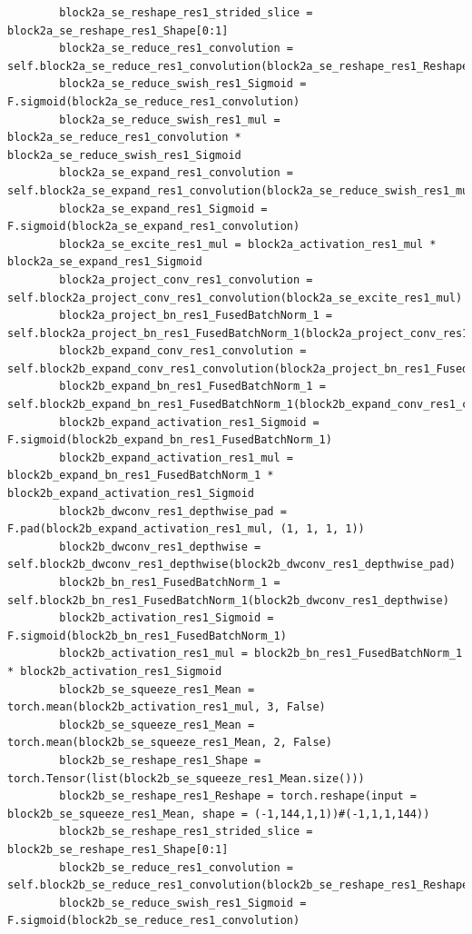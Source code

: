 \documentclass{fisatprojectfinal}
\begin{document}
\begin{appendices}
\begin{lstlisting}
        block2a_se_reshape_res1_strided_slice = block2a_se_reshape_res1_Shape[0:1]
        block2a_se_reduce_res1_convolution = self.block2a_se_reduce_res1_convolution(block2a_se_reshape_res1_Reshape)
        block2a_se_reduce_swish_res1_Sigmoid = F.sigmoid(block2a_se_reduce_res1_convolution)
        block2a_se_reduce_swish_res1_mul = block2a_se_reduce_res1_convolution * block2a_se_reduce_swish_res1_Sigmoid
        block2a_se_expand_res1_convolution = self.block2a_se_expand_res1_convolution(block2a_se_reduce_swish_res1_mul)
        block2a_se_expand_res1_Sigmoid = F.sigmoid(block2a_se_expand_res1_convolution)
        block2a_se_excite_res1_mul = block2a_activation_res1_mul * block2a_se_expand_res1_Sigmoid
        block2a_project_conv_res1_convolution = self.block2a_project_conv_res1_convolution(block2a_se_excite_res1_mul)
        block2a_project_bn_res1_FusedBatchNorm_1 = self.block2a_project_bn_res1_FusedBatchNorm_1(block2a_project_conv_res1_convolution)
        block2b_expand_conv_res1_convolution = self.block2b_expand_conv_res1_convolution(block2a_project_bn_res1_FusedBatchNorm_1)
        block2b_expand_bn_res1_FusedBatchNorm_1 = self.block2b_expand_bn_res1_FusedBatchNorm_1(block2b_expand_conv_res1_convolution)
        block2b_expand_activation_res1_Sigmoid = F.sigmoid(block2b_expand_bn_res1_FusedBatchNorm_1)
        block2b_expand_activation_res1_mul = block2b_expand_bn_res1_FusedBatchNorm_1 * block2b_expand_activation_res1_Sigmoid
        block2b_dwconv_res1_depthwise_pad = F.pad(block2b_expand_activation_res1_mul, (1, 1, 1, 1))
        block2b_dwconv_res1_depthwise = self.block2b_dwconv_res1_depthwise(block2b_dwconv_res1_depthwise_pad)
        block2b_bn_res1_FusedBatchNorm_1 = self.block2b_bn_res1_FusedBatchNorm_1(block2b_dwconv_res1_depthwise)
        block2b_activation_res1_Sigmoid = F.sigmoid(block2b_bn_res1_FusedBatchNorm_1)
        block2b_activation_res1_mul = block2b_bn_res1_FusedBatchNorm_1 * block2b_activation_res1_Sigmoid
        block2b_se_squeeze_res1_Mean = torch.mean(block2b_activation_res1_mul, 3, False)
        block2b_se_squeeze_res1_Mean = torch.mean(block2b_se_squeeze_res1_Mean, 2, False)
        block2b_se_reshape_res1_Shape = torch.Tensor(list(block2b_se_squeeze_res1_Mean.size()))
        block2b_se_reshape_res1_Reshape = torch.reshape(input = block2b_se_squeeze_res1_Mean, shape = (-1,144,1,1))#(-1,1,1,144))
        block2b_se_reshape_res1_strided_slice = block2b_se_reshape_res1_Shape[0:1]
        block2b_se_reduce_res1_convolution = self.block2b_se_reduce_res1_convolution(block2b_se_reshape_res1_Reshape)
        block2b_se_reduce_swish_res1_Sigmoid = F.sigmoid(block2b_se_reduce_res1_convolution)

\end{lstlisting}
\end{appendices}
\end{document}
